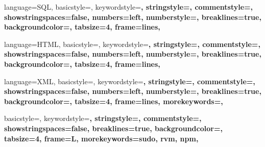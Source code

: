 {
  language=SQL,
  basicstyle=\ttfamily\small,
  keywordstyle=\color{blue}\bfseries,
  stringstyle=\color{string},
  commentstyle=\color{comentary},
  showstringspaces=false,
  numbers=left,
  numberstyle=\tiny,
  breaklines=true,
  backgroundcolor=\color{white},
  tabsize=4,
  frame=lines,
}

 {
  language=HTML,
  basicstyle=\ttfamily\small,
  keywordstyle=\color{red}\bfseries,
  stringstyle=\color{string},
  commentstyle=\color{comentary},
  showstringspaces=false,
  numbers=left,
  numberstyle=\tiny,
  breaklines=true,
  backgroundcolor=\color{white},
  tabsize=4,
  frame=lines,
}

 {
  language=XML,
  basicstyle=\ttfamily\small,
  keywordstyle=\color{purple}\bfseries,
  stringstyle=\color{string},
  commentstyle=\color{comentary},
  showstringspaces=false,
  numbers=left,
  numberstyle=\tiny,
  breaklines=true,
  backgroundcolor=\color{white},
  tabsize=4,
  frame=lines,
  morekeywords={},
}

 {
  basicstyle=\ttfamily\small,
  keywordstyle=\color{purple}\bfseries,
  stringstyle=\color{string},
  commentstyle=\color{comentary},
  showstringspaces=false,
  breaklines=true,
  backgroundcolor=\color{prompt},
  tabsize=4,
  frame=L,
  morekeywords={sudo, rvm, npm},
}

